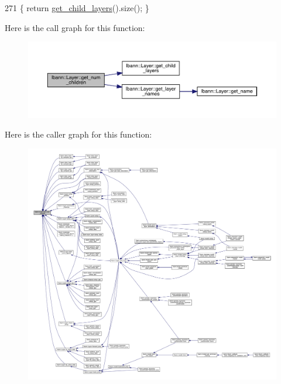 \begin{DoxyCode}
271 \{ \textcolor{keywordflow}{return} \hyperlink{classlbann_1_1Layer_aa0058c8ec4913efc3e4de5d6f61eb8db}{get\_child\_layers}().size(); \}
\end{DoxyCode}
Here is the call graph for this function\+:\nopagebreak
\begin{figure}[H]
\begin{center}
\leavevmode
\includegraphics[width=350pt]{classlbann_1_1Layer_a1409a117c31a7ea4f2c7a4d22a3e86c3_cgraph}
\end{center}
\end{figure}
Here is the caller graph for this function\+:\nopagebreak
\begin{figure}[H]
\begin{center}
\leavevmode
\includegraphics[width=350pt]{classlbann_1_1Layer_a1409a117c31a7ea4f2c7a4d22a3e86c3_icgraph}
\end{center}
\end{figure}
\mbox{\label{classlbann_1_1Layer_aa35561e662de84deae26045ccb53d862}} 
